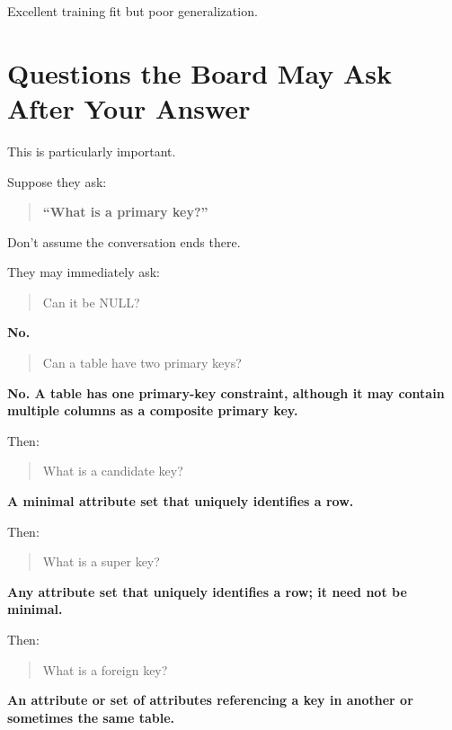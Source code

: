 Excellent training fit but poor generalization.

\medskip

\section{Questions the Board May Ask After Your Answer}

This is particularly important.

Suppose they ask:

\begin{quote}
\textbf{``What is a primary key?''}\\
\end{quote}

Don't assume the conversation ends there.

They may immediately ask:

\begin{quote}
Can it be NULL?\\
\end{quote}

\textbf{No.}

\begin{quote}
Can a table have two primary keys?\\
\end{quote}

\textbf{No. A table has one primary-key constraint, although it may contain multiple columns as a composite primary key.}

Then:

\begin{quote}
What is a candidate key?\\
\end{quote}

\textbf{A minimal attribute set that uniquely identifies a row.}

Then:

\begin{quote}
What is a super key?\\
\end{quote}

\textbf{Any attribute set that uniquely identifies a row; it need not be minimal.}

Then:

\begin{quote}
What is a foreign key?\\
\end{quote}

\textbf{An attribute or set of attributes referencing a key in another or sometimes the same table.}

